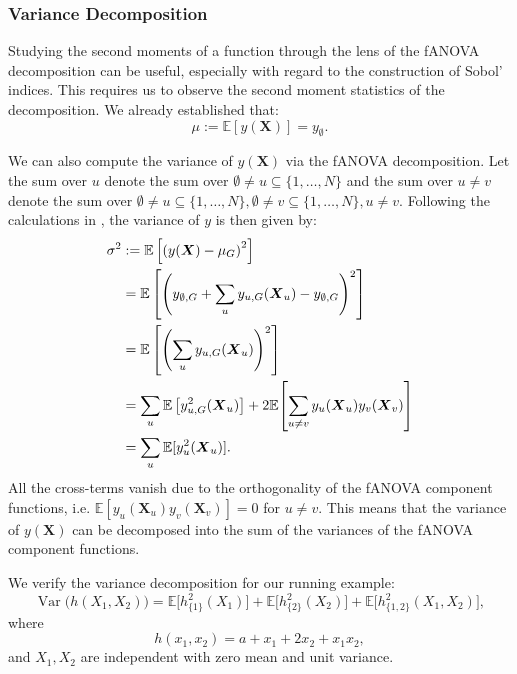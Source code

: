 \subsubsection{Variance Decomposition}
Studying the second moments of  a function through the lens of the fANOVA decomposition can be useful, especially with regard to the construction of Sobol' indices. This requires us to observe the second moment statistics of the decomposition. We already established that:
$$ \mu := \mathbb{E}[y(\boldsymbol{X})] = y_{\emptyset}.$$

We can also compute the variance of $y(\boldsymbol{X})$ via the fANOVA decomposition.
Let the sum over $u$ denote the sum over $\emptyset \neq u \subseteq \{1, \dots, N\}$ and the sum over $u \neq v$ denote the sum over $\emptyset \neq u \subseteq \{1, \dots, N\}, \emptyset \neq v \subseteq \{1, \dots, N\}, u \neq v$.
Following the calculations in \cite{rahman2014}, the variance of $y$ is then given by:
\begin{align}\label{eq:variance_decomposition_classical}
\sigma^2 
&:= \mathbb{E}\left[ \left( y(\boldsymbol{X}) - \mu_G \right)^2 \right] \notag \\
&= \mathbb{E} \left[ \left( y_{\emptyset,G} + \sum_{u} y_{u,G}(\boldsymbol{X}_u) - y_{\emptyset,G} \right)^2 \right] \notag \\
&= \mathbb{E} \left[ \left( \sum_{u} y_{u,G}(\boldsymbol{X}_u) \right)^2 \right] \notag \\
&= \sum_{u} \mathbb{E} \left[ y_{u,G}^2(\boldsymbol{X}_u) \right]
 + 2 \mathbb{E}\!\left[\sum_{u \neq v} y_u({\boldsymbol{X}_u}) y_v({\boldsymbol{X}_v})\right] \notag \\ 
& = \sum_{u} \mathbb{E}[y_u^2({\boldsymbol{X}_u})].
\end{align}
All the cross-terms vanish due to the orthogonality of the fANOVA component functions, i.e. $\mathbb{E}[y_u({\boldsymbol{X}_u})  y_v({\boldsymbol{X}_v})] = 0$ for $u \neq v$.
This means that the variance of $y(\boldsymbol{X})$ can be decomposed into the sum of the variances of the fANOVA component functions.\par

We verify the variance decomposition for our running example:
\[
  \operatorname{Var}\big(h(X_1,X_2)\big)
  = \mathbb{E}\!\big[h_{\{1\}}^2(X_1)\big]
  + \mathbb{E}\!\big[h_{\{2\}}^2(X_2)\big]
  + \mathbb{E}\!\big[h_{\{1,2\}}^2(X_1,X_2)\big],
\]
where 
\[
  h(x_1,x_2) = a + x_1 + 2x_2 + x_1x_2,
\]
and $X_1,X_2$ are independent with zero mean and unit variance.

